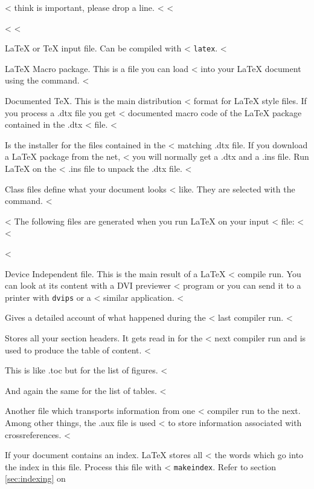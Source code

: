 \begin{lined}{12cm}
\begin{lined}{\textwidth}
\begin{lined}{12cm}
\begin{lined}{\textwidth}
\begin{table}[!hbp]
\begin{table}[btp]
\begin{lined}{11cm}
\begin{lined}{\textwidth}
< think is important, please drop a line.
< 
< \begin{description}
<   
< \item[\wi{.tex}] \LaTeX{} or \TeX{} input file. Can be compiled with
<   \texttt{latex}.
< \item[\wi{.sty}] \LaTeX{} Macro package. This is a file you can load
<   into your \LaTeX{} document using the  command.
< \item[\wi{.dtx}] Documented \TeX{}. This is the main distribution
<   format for \LaTeX{} style files. If you process a .dtx file you get
<   documented macro code of the \LaTeX{} package contained in the .dtx
<   file.
< \item[\wi{.ins}] Is the installer for the files contained in the
<   matching .dtx file. If you download a \LaTeX{} package from the net,
<   you will normally get a .dtx and a .ins file. Run \LaTeX{} on the
<   .ins file to unpack the .dtx file.
< \item[\wi{.cls}] Class files define what your document looks
<   like. They are selected with the  command.
< \end{description}
< The following files are generated when you run \LaTeX{} on your input
< file:
< 
< \begin{description}
< \item[\wi{.dvi}] Device Independent file. This is the main result of a \LaTeX{}
<   compile run. You can look at its content with a DVI previewer
<   program or you can send it to a printer with \texttt{dvips} or a
<   similar application.
< \item[\wi{.log}] Gives a detailed account of what happened during the
<   last compiler run.
< \item[\wi{.toc}] Stores all your section headers. It gets read in for the
<   next compiler run and is used to produce the table of content.
< \item[\wi{.lof}] This is like .toc but for the list of figures.
< \item[\wi{.lot}] And again the same for the list of tables.
< \item[\wi{.aux}] Another file which transports information from one
<   compiler run to the next. Among other things, the .aux file is used
<   to store information associated with crossreferences.
< \item[\wi{.idx}] If your document contains an index. \LaTeX{} stores all
<   the words which go into the index in this file. Process this file with
<   \texttt{makeindex}. Refer to section \ref{sec:indexing} on

\end{description}
\end{lined}
\end{lined}
\end{table}
\end{table}
\end{lined}
\end{lined}
\end{lined}
\end{lined}
